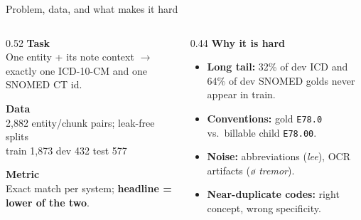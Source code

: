 \documentclass[aspectratio=169,10pt]{beamer}
\newcommand{\code}[1]{\texttt{#1}}
\newcommand{\hl}[1]{\textcolor{accent}{\textbf{#1}}}
\begin{document}
\begin{frame}{Problem, data, and what makes it hard}
\begin{columns}[T]
\begin{column}{0.52\textwidth}
\textbf{Task}\\[1pt]
One entity + its note context $\rightarrow$ exactly one ICD-10-CM and one SNOMED CT id.

\vspace{3mm}
\textbf{Data}\\
2{,}882 entity/chunk pairs; leak-free splits\\[1pt]
{\small train 1{,}873 \;\textbar\; dev 432 \;\textbar\; test 577}

\vspace{3mm}
\textbf{Metric}\\
Exact match per system; \hl{headline = lower of the two}.
\end{column}
\begin{column}{0.44\textwidth}
\textbf{Why it is hard}
\begin{itemize}\setlength\itemsep{1.5pt}
\item \textbf{Long tail:} 32\% of dev ICD and 64\% of dev SNOMED golds never appear in train.
\item \textbf{Conventions:} gold \code{E78.0} vs.\ billable child \code{E78.00}.
\item \textbf{Noise:} abbreviations (\emph{lee}), OCR artifacts (\emph{\o{} tremor}).
\item \textbf{Near-duplicate codes:} right concept, wrong specificity.
\end{itemize}
\end{column}
\end{columns}
\end{frame}
\end{document}
